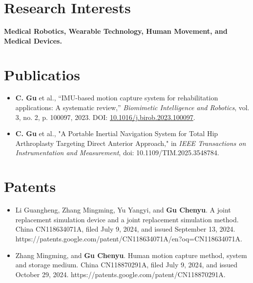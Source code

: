 \documentclass[letterpaper,11pt]{article}
\newcommand{\resumeItem}[1]{
  \item\small{
    {#1 \vspace{-2pt}}
  }
}
\newcommand{\resumeItemListStart}{\begin{itemize}}
\newcommand{\resumeItemListEnd}{\end{itemize}\vspace{-5pt}}
\begin{document}
\section{Research Interests}
\vspace{2pt}
\textbf{Medical Robotics, Wearable Technology, Human Movement, and Medical Devices.}

\section{Publicatios}
\vspace{3pt}
\resumeItemListStart
  \resumeItem{
    \textbf{C. Gu} et al., “IMU-based motion capture system for rehabilitation applications: A systematic
    review,” \textit{Biomimetic Intelligence and Robotics}, vol. 3, no. 2, p. 100097, 2023. DOI: \href{https://doi.org/10.1016/j.birob.2023.100097}{10.1016/j.birob.2023.100097}.
  }
  \resumeItem{
  \textbf{C. Gu} et al., "A Portable Inertial Navigation System for Total Hip Arthroplasty Targeting Direct Anterior Approach," in \textit{IEEE Transactions on Instrumentation and Measurement}, doi: 10.1109/TIM.2025.3548784.
  }
\resumeItemListEnd

\section{Patents}
\vspace{3pt}
\resumeItemListStart
  \resumeItem{
Li Guangheng, Zhang Mingming, Yu Yangyi, and \textbf{Gu Chenyu}. A joint replacement simulation device and a joint replacement simulation method. China CN118634071A, filed July 9, 2024, and issued September 13, 2024. https://patents.google.com/patent/CN118634071A/en?oq=CN118634071A.
  }
  \resumeItem{
    Zhang Mingming, and \textbf{Gu Chenyu}. Human motion capture method, system and storage medium. China CN118870291A, filed July 9, 2024, and issued October 29, 2024. https://patents.google.com/patent/CN118870291A.
  }
\resumeItemListEnd

\end{document}
